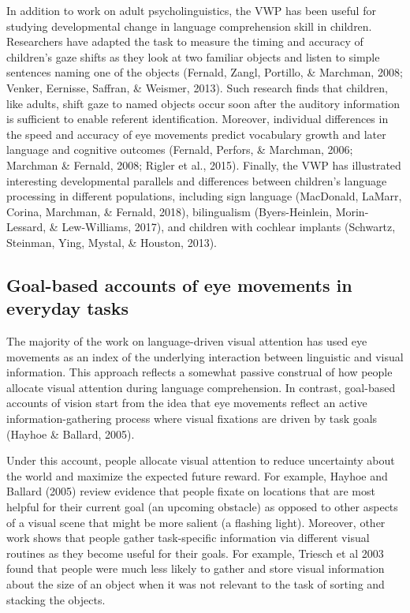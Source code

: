 \documentclass[english,floatsintext,man]{apa6}
\begin{document}
In addition to work on adult psycholinguistics, the VWP has been useful
for studying developmental change in language comprehension skill in
children. Researchers have adapted the task to measure the timing and
accuracy of children's gaze shifts as they look at two familiar objects
and listen to simple sentences naming one of the objects (Fernald,
Zangl, Portillo, \& Marchman, 2008; Venker, Eernisse, Saffran, \&
Weismer, 2013). Such research finds that children, like adults, shift
gaze to named objects occur soon after the auditory information is
sufficient to enable referent identification. Moreover, individual
differences in the speed and accuracy of eye movements predict
vocabulary growth and later language and cognitive outcomes (Fernald,
Perfors, \& Marchman, 2006; Marchman \& Fernald, 2008; Rigler et al.,
2015). Finally, the VWP has illustrated interesting developmental
parallels and differences between children's language processing in
different populations, including sign language (MacDonald, LaMarr,
Corina, Marchman, \& Fernald, 2018), bilingualism (Byers-Heinlein,
Morin-Lessard, \& Lew-Williams, 2017), and children with cochlear
implants (Schwartz, Steinman, Ying, Mystal, \& Houston, 2013).

\hypertarget{goal-based-accounts-of-eye-movements-in-everyday-tasks}{%
\subsection{Goal-based accounts of eye movements in everyday
tasks}\label{goal-based-accounts-of-eye-movements-in-everyday-tasks}}

The majority of the work on language-driven visual attention has used
eye movements as an index of the underlying interaction between
linguistic and visual information. This approach reflects a somewhat
passive construal of how people allocate visual attention during
language comprehension. In contrast, goal-based accounts of vision start
from the idea that eye movements reflect an active information-gathering
process where visual fixations are driven by task goals (Hayhoe \&
Ballard, 2005).

Under this account, people allocate visual attention to reduce
uncertainty about the world and maximize the expected future reward. For
example, Hayhoe and Ballard (2005) review evidence that people fixate on
locations that are most helpful for their current goal (an upcoming
obstacle) as opposed to other aspects of a visual scene that might be
more salient (a flashing light). Moreover, other work shows that people
gather task-specific information via different visual routines as they
become useful for their goals. For example, Triesch et al 2003 found
that people were much less likely to gather and store visual information
about the size of an object when it was not relevant to the task of
sorting and stacking the objects.
\end{document}
